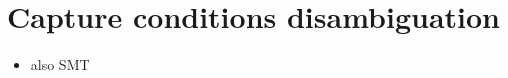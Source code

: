 \begin{comment}
\begin{algorithm}
\begin{algorithmic}[1]
\Procedure{all\_sublists}{$l$}
  \For {$i \gets 1, |l|+1$}  \Comment{Sub-lists can have size 1 to \(|l|\)}
    \For {$j \gets i,  \textrm{min}(i + |l|, |l|)$}
        \State \textbf{yield} \(l\)[\(i\):\(j\)]
    \EndFor
  \EndFor
\EndProcedure
\end{algorithmic}
\caption{Compute all possible sub-lists of a list \(l\).}
\label{all-sublists}
\end{algorithm}

\begin{algorithm}
\begin{algorithmic}[1]
\Procedure{all\_n\_sublists}{$l$, $n$}
  \If{$n$=1}
    \State \textbf{yield} from map(list, \Call{all\_sublists}{$l$})
  \Statex
  \Else
    \For {\textit{split\_idx} $\gets 1, |l|- (n-2)$} \Comment{split \(l\) into 2 sub-lists on index \textit{split\_idx}}
      \ForAll {\textit{left} \(\in\) \Call{all\_sublists}{$l$[:\textit{split\_idx}]}}
          \If{\textit{left}[-1] \(\ne\) $l$[\textit{split\_idx}-1]}
          \Comment{avoid repeated splits}
            \State \textbf{continue}
          \EndIf
          \Statex
          \ForAll{\textit{right} \(\in\) \Call{all\_n\_sublists}{$l$[\textit{split\_idx}:], $n$-1}}
            \State \textbf{yield} list(\textit{left}) + \textit{right}
          \EndFor
      \EndFor
    \EndFor
  \EndIf
  
\EndProcedure
\end{algorithmic}
\caption{Compute all possible partitions of \(l\) into \(n\) non-overlapping sub-lists.}
\label{all-n-sublists}
\end{algorithm}

\end{comment}

\section{Capture conditions disambiguation}
\begin{itemize}
    \item also SMT
\end{itemize}
